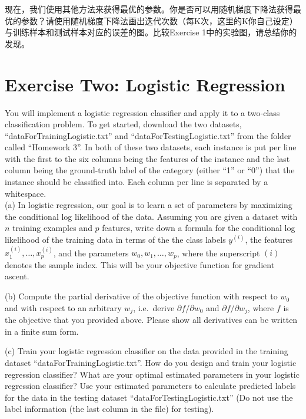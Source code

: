 \documentclass[a4paper]{article}
\theoremstyle{definition}
\begin{document}
现在，我们使用其他方法来获得最优的参数。你是否可以用随机梯度下降法获得最优的参数？请使用随机梯度下降法画出迭代次数（每K次，这里的K你自己设定）与训练样本和测试样本对应的误差的图。比较Exercise 1中的实验图，请总结你的发现。

\section{Exercise Two: Logistic Regression}
You will implement a logistic regression classifier and apply it to a two-class classification problem.
To get started, download the two datasets, ``dataForTrainingLogistic.txt'' and ``dataForTestingLogistic.txt'' from the folder called ``Homework 3''. In both of these two datasets, each instance is put per line with the first to the six columns being the features of the instance and the last column being the ground-truth label of the category (either ``1'' or ``0'') that the instance should be classified into. Each column per line is separated by a whitespace.\\


(a) In logistic regression, our goal is to learn a set of parameters by maximizing the conditional log likelihood of the data. Assuming you are given a dataset with $n$ training examples and $p$ features, write down a formula for the conditional log likelihood of the training data in terms of the the class labels $y^{(i)}$, the features $x^{(i)}_1, \ldots, x^{(i)}_p$, and the parameters $w_0, w_1, \ldots, w_p$, where the superscript $(i)$ denotes the sample index. This will be your objective function for gradient ascent. \newline

(b) Compute the partial derivative of the objective function with respect to $w_0$ and with respect to an arbitrary $w_j$, i.e.~derive $\partial f / \partial w_0$ and $\partial f / \partial w_j$, where $f$ is the objective that you provided above.
Please show all derivatives can be written in a finite sum form.\newline

(c) Train your logistic regression classifier on the data provided in the training dataset ``dataForTrainingLogistic.txt''. How do you design and train your logistic regression classifier? What are your optimal estimated parameters in your logistic regression classifier? Use your estimated parameters  to calculate predicted labels for the data in the testing dataset ``dataForTestingLogistic.txt'' (Do not use the label information (the last column in the file) for testing).\\
\end{document}
